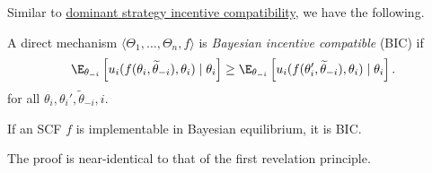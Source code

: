 Similar to \hyperref[def: dsic]{dominant strategy incentive compatibility}, we have the following.

\begin{fdef}
	\label{def: bic}
	A direct mechanism $\langle \Theta_1,\ldots,\Theta_n,f\rangle$ is \emph{Bayesian incentive compatible} (BIC) if
	\begin{equation}
		\label{eqn: dsic}
		\E_{\theta_{-i}} \left[ u_i(f(\theta_i,\widetilde{\theta}_{-i}),\theta_i) \mid \theta_i \right] \ge \E_{\theta_{-i}} \left[ u_i(f(\theta_i',\widetilde{\theta}_{-i}),\theta_i) \mid \theta_i \right].
	\end{equation}
	for all $\theta_i,\theta_i',\widetilde{\theta}_{-i},i$.
\end{fdef}

\begin{ftheo}
	If an SCF $f$ is implementable in Bayesian equilibrium, it is BIC.
\end{ftheo}

The proof is near-identical to that of the first revelation principle.